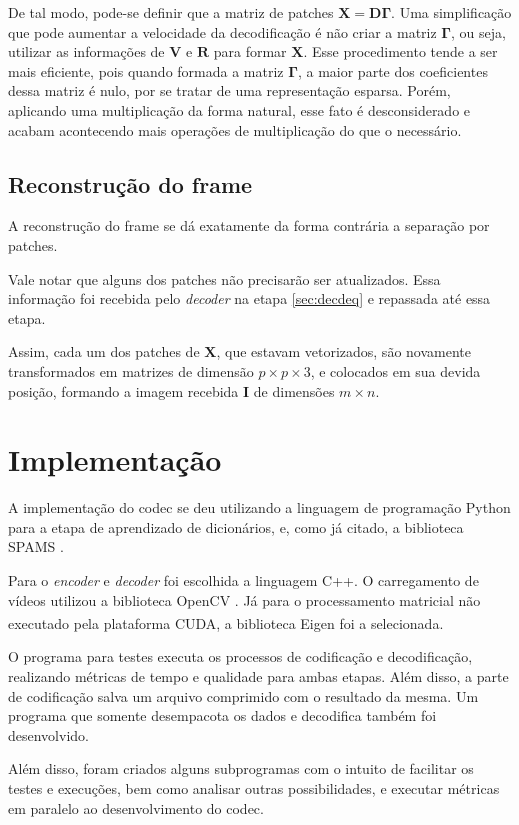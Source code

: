 \documentclass[cic,tc]{iiufrgs}
\newcommand{\mat}[1]{\bm{#1}}
\newcommand{\reg}{\textsuperscript{\textregistered}}
\begin{document}
De tal modo, pode-se definir que a matriz de patches $\mat{X} = \mat{D} \mat{\Gamma}$.
Uma simplificação que pode aumentar a velocidade da decodificação é não criar a matriz $\mat{\Gamma}$,
ou seja, utilizar as informações de $\mat{V}$ e $\mat{R}$ para formar $\mat{X}$. 
Esse procedimento tende a ser mais eficiente, pois quando formada a matriz $\mat{\Gamma}$, 
a maior parte dos coeficientes dessa matriz é nulo, por se tratar de uma representação esparsa.
Porém, aplicando uma multiplicação da forma natural, esse fato é desconsiderado e acabam
acontecendo mais operações de multiplicação do que o necessário.

\subsection{Reconstrução do frame}
A reconstrução do frame se dá exatamente da forma contrária a separação por patches.

Vale notar que alguns dos patches não precisarão ser atualizados.
Essa informação foi recebida pelo \textit{decoder} na etapa \autoref{sec:decdeq} e repassada
até essa etapa.

Assim, cada um dos patches de $\mat{X}$, que estavam vetorizados, são novamente transformados
em matrizes de dimensão $p \times p \times 3$, e colocados em sua devida posição, formando
a imagem recebida $\mat{I}$ de dimensões $m \times n$.

\section{Implementação}
A implementação do codec se deu utilizando a linguagem de programação Python para a etapa 
de aprendizado de dicionários, e, como já citado, a biblioteca SPAMS \cite{SPAMS}.

Para o \emph{encoder} e \emph{decoder} foi escolhida a linguagem C++. 
O carregamento de vídeos utilizou a biblioteca OpenCV \cite{OpenCV}.
Já para o processamento matricial não executado pela plataforma CUDA\reg, a biblioteca 
Eigen \cite{Eigen} foi a selecionada.

O programa para testes executa os processos de codificação e decodificação, realizando 
métricas de tempo e qualidade para ambas etapas.
Além disso, a parte de codificação salva um arquivo comprimido com o resultado da mesma.
Um programa que somente desempacota os dados e decodifica também foi desenvolvido.

Além disso, foram criados alguns subprogramas com o intuito de facilitar os testes e 
execuções, bem como analisar outras possibilidades, e executar métricas em paralelo ao 
desenvolvimento do codec.
\end{document}
